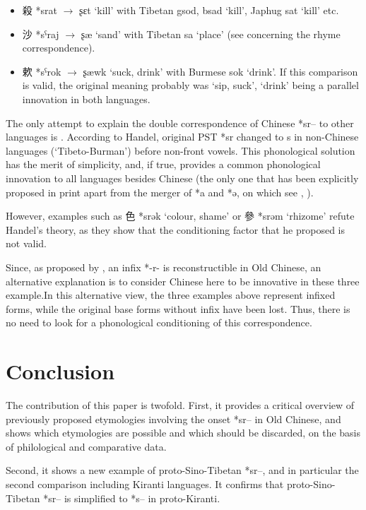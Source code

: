 \documentclass[oldfontcommands,oneside,a4paper,11pt]{article}
\newcommand{\ipa}[1]{{\phon #1}} %
\newcommand{\zh}[1]{{\cn #1}}
\begin{document}
\begin{itemize}

\item  \zh{殺} *\ipa{srat} $\rightarrow$ \ipa{ʂɛt} `kill' with Tibetan \ipa{gsod, bsad} `kill', Japhug \ipa{sat} `kill' etc.

\item \zh{沙} *\ipa{sˁraj} $\rightarrow$ \ipa{ʂæ} `sand'  with Tibetan \ipa{sa} `place' (see \citealt{hill14jrn} concerning the rhyme correspondence).

\item  \zh{欶} *\ipa{sˁrok} $\rightarrow$ \ipa{ʂæwk} `suck, drink' with Burmese \ipa{sok} `drink'. If this comparison is valid, the original meaning probably was `sip, suck', `drink' being a parallel innovation in both languages.

\end{itemize}
The only attempt to explain the double correspondence of Chinese *\ipa{sr--} to other languages is \citet[25]{handel02r}. According to Handel, original PST *\ipa{sr} changed to s in non-Chinese languages (`Tibeto-Burman') before non-front vowels. This phonological solution has the merit of simplicity, and, if true, provides a common phonological innovation to all languages besides Chinese (the only one that has been explicitly proposed in print apart from the merger of *\ipa{a} and *\ipa{ə}, on which see \citealt{gong95st}, \citealt{handel08st}).

However, examples such as \zh{色} *\ipa{srək} `colour, shame' or \zh{參} *\ipa{srəm} `rhizome' refute Handel's theory, as they show that the conditioning factor that he proposed is not valid.

Since, as proposed by \citet{sagart99roc}, an infix *\ipa{-r-} is reconstructible in Old Chinese, an alternative explanation is to consider Chinese here to be innovative in these three example.In this alternative view, the three examples above represent infixed forms, while the original base forms without infix have been lost. Thus, there is no need to look for a phonological conditioning of this correspondence.


\section{Conclusion}

The contribution of this paper is twofold. First, it provides a critical overview of previously proposed etymologies involving the onset *\ipa{sr--} in Old Chinese, and shows which etymologies are possible and which should be discarded, on the basis of philological and comparative data.

Second, it shows a new example of proto-Sino-Tibetan *\ipa{sr--}, and in particular the second comparison including Kiranti languages. It confirms that proto-Sino-Tibetan *\ipa{sr--} is simplified to *\ipa{s--} in proto-Kiranti.




\end{document}
